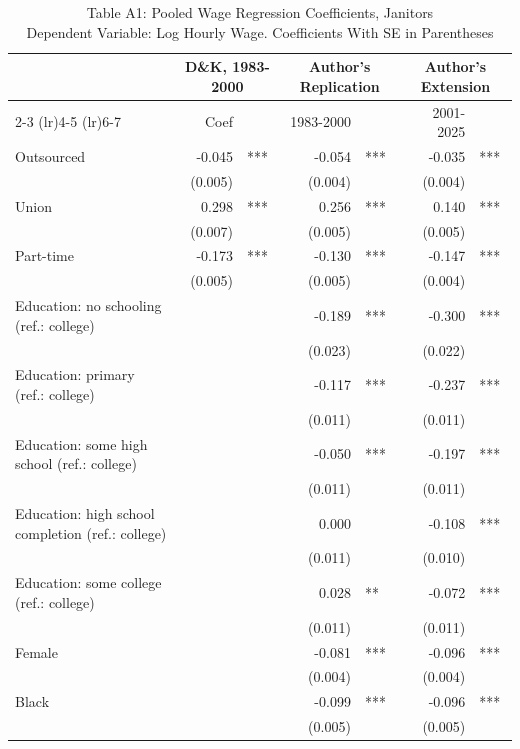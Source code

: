 \begin{table}[!t]
\caption*{
{\large Table A1: Pooled Wage Regression Coefficients, Janitors} \\
{\small Dependent Variable: Log Hourly Wage. Coefficients With SE in Parentheses}
} 

\fontsize{10.0pt}{12.0pt}\selectfont

\begin{tabular*}{\linewidth}{@{\extracolsep{\fill}}l|rlrl|rl}
\toprule
  & \multicolumn{2}{c}{D\&K, 1983-2000} & \multicolumn{2}{c}{Author's Replication} & \multicolumn{2}{c}{Author's Extension} \\ 
\cmidrule(lr){2-3} \cmidrule(lr){4-5} \cmidrule(lr){6-7}
  & Coef &  & 1983-2000 &  & 2001-2025 &  \\ 
\midrule\addlinespace[2.5pt]
Outsourced & -0.045 & *** & -0.054 & *** & -0.035 & *** \\
 & (0.005) &  & (0.004) &  & (0.004) &  \\
Union & 0.298 & *** & 0.256 & *** & 0.140 & *** \\
 & (0.007) &  & (0.005) &  & (0.005) &  \\
Part-time & -0.173 & *** & -0.130 & *** & -0.147 & *** \\
 & (0.005) &  & (0.005) &  & (0.004) &  \\
Education: no schooling (ref.: college) &  &  & -0.189 & *** & -0.300 & *** \\
 &  &  & (0.023) &  & (0.022) &  \\
Education: primary (ref.: college) &  &  & -0.117 & *** & -0.237 & *** \\
 &  &  & (0.011) &  & (0.011) &  \\
Education: some high school (ref.: college) &  &  & -0.050 & *** & -0.197 & *** \\
 &  &  & (0.011) &  & (0.011) &  \\
Education: high school completion (ref.: college) &  &  & 0.000 &  & -0.108 & *** \\
 &  &  & (0.011) &  & (0.010) &  \\
Education: some college (ref.: college) &  &  & 0.028 & ** & -0.072 & *** \\
 &  &  & (0.011) &  & (0.011) &  \\
Female &  &  & -0.081 & *** & -0.096 & *** \\
 &  &  & (0.004) &  & (0.004) &  \\
Black &  &  & -0.099 & *** & -0.096 & *** \\
 &  &  & (0.005) &  & (0.005) &  \\

\end{tabular*}
\end{table}
